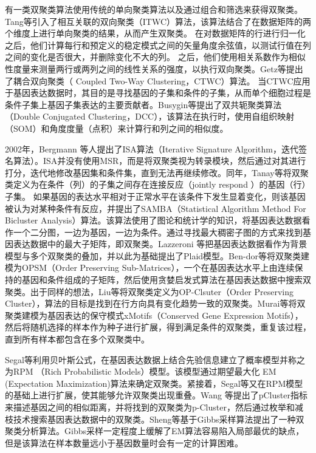     有一类双聚类算法使用传统的单向聚类算法以及通过组合和筛选来获得双聚类。Tang等引入了相互关联的双向聚类（ITWC）算法，该算法结合了在数据矩阵的两个维度上进行单向聚类的结果，从而产生双聚类。 在对数据矩阵的行进行归一化之后，他们计算每行和预定义的稳定模式之间的矢量角度余弦值，以测试行值在列之间的变化是否很大，并删除变化不大的列。 之后，他们使用相关系数作为相似性度量来测量两行或两列之间的线性关系的强度，以执行双向聚类。Getz等提出了耦合双向聚类（ Coupled Two-Way Clustering，CTWC）算法。 当CTWC应用于基因表达数据时，其目的是寻找基因的子集和条件的子集，从而单个细胞过程是条件子集上基因子集表达的主要贡献者。Busygin等提出了双共轭聚类算法（Double Conjugated Clustering，DCC），该算法在执行时，使用自组织映射（SOM）和角度度量（点积）来计算行和列之间的相似度。

    2002年，Bergmann 等人提出了ISA算法（Iterative Signature Algorithm，迭代签名算法）。ISA并没有使用MSR，而是将双聚类视为转录模块，然后通过对其进行打分，迭代地修改基因集和条件集，直到无法再继续修改。同年，Tanay等将双聚类定义为在条件（列）的子集之间存在连接反应（jointly respond ）的基因（行）子集。 如果基因的表达水平相对于正常水平在该条件下发生显着变化，则该基因被认为对某种条件有反应，并提出了SAMBA（Statistical Algorithm Method For Bicluster Analysis）算法。该算法使用了图论和统计学的知识，将基因表达数据看作一个二分图，一边为基因，一边为条件。通过寻找最大稠密子图的方式来找到基因表达数据中的最大子矩阵，即双聚类。Lazzeroni 等把基因表达数据看作为背景模型与多个双聚类的叠加，并以此为基础提出了Plaid模型。Ben-dor等将双聚类建模为OPSM（Order Preserving Sub-Matrices），一个在基因表达水平上由连续保持的基因和条件组成的子矩阵，然后使用贪婪启发式算法在基因表达数据中搜索双聚类。出于同样的想法，Liu等将双聚类定义为OP-Clsuter（Order Preserving Cluster），算法的目标是找到在行方向具有变化趋势一致的双聚类。Murai等将双聚类建模为基因表达的保守模式xMotifs（Conserved Gene Expression Motifs），然后将随机选择的样本作为种子进行扩展，得到满足条件的双聚类，重复该过程，直到所有样本都包含在多个双聚类中。

    Segal等利用贝叶斯公式，在基因表达数据上结合先验信息建立了概率模型并称之为RPM （Rich Probabilistic Models）模型。该模型通过期望最大化 EM (Expectation Maximization)算法来确定双聚类。紧接着，Segal等又在RPM模型的基础上进行扩展，使其能够允许双聚类出现重叠。Wang 等提出了pCluster指标来描述基因之间的相似距离，并将找到的双聚类为p-Cluster，然后通过枚举和减枝技术搜索基因表达数据中的双聚类。Sheng等基于Gibbs采样算法提出了一种双聚类分析算法。Gibbs采样一定程度上缓解了EM算法容易陷入局部最优的缺点，但是该算法在样本数量远小于基因数量时会有一定的计算困难。

